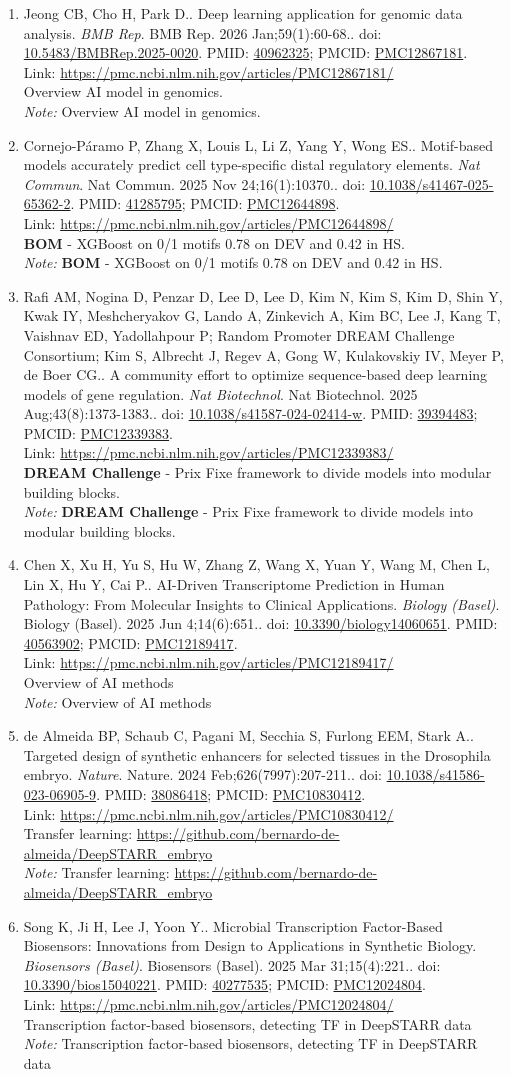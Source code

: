 \documentclass[12pt]{article}
\newcommand{\Pub}[9]{%
  \item #1. #2. \textit{#3}. #4. doi: \href{https://doi.org/#5}{#5}. PMID: \href{https://pubmed.ncbi.nlm.nih.gov/#6/}{#6}; PMCID: \href{https://www.ncbi.nlm.nih.gov/pmc/articles/#7/}{#7}. \\
  \noindent Link: \url{#8}\\
  \ifx#9\relax\else\\\textit{Note:} #9\fi
}
\begin{document}
\begin{enumerate}[leftmargin=*,label=\textbf{\arabic*.}]
\Pub{Jeong CB, Cho H, Park D.}{Deep learning application for genomic data analysis}{BMB Rep}{BMB Rep. 2026 Jan;59(1):60-68.}{10.5483/BMBRep.2025-0020}{40962325}{PMC12867181}{https://pmc.ncbi.nlm.nih.gov/articles/PMC12867181/}{Overview AI model in genomics.}

\Pub{Cornejo-Páramo P, Zhang X, Louis L, Li Z, Yang Y, Wong ES.}{Motif-based models accurately predict cell type-specific distal regulatory elements}{Nat Commun}{Nat Commun. 2025 Nov 24;16(1):10370.}{10.1038/s41467-025-65362-2}{41285795}{PMC12644898}{https://pmc.ncbi.nlm.nih.gov/articles/PMC12644898/}{\textbf{BOM} - XGBoost on 0/1 motifs 0.78 on DEV and 0.42 in HS.}

\newpage

\Pub{Rafi AM, Nogina D, Penzar D, Lee D, Lee D, Kim N, Kim S, Kim D, Shin Y, Kwak IY, Meshcheryakov G, Lando A, Zinkevich A, Kim BC, Lee J, Kang T, Vaishnav ED, Yadollahpour P; Random Promoter DREAM Challenge Consortium; Kim S, Albrecht J, Regev A, Gong W, Kulakovskiy IV, Meyer P, de Boer CG.}{A community effort to optimize sequence-based deep learning models of gene regulation}{Nat Biotechnol}{Nat Biotechnol. 2025 Aug;43(8):1373-1383.}{10.1038/s41587-024-02414-w}{39394483}{PMC12339383}{https://pmc.ncbi.nlm.nih.gov/articles/PMC12339383/}{\textbf{DREAM Challenge} - Prix Fixe framework to divide models into modular building blocks.}

\Pub{Chen X, Xu H, Yu S, Hu W, Zhang Z, Wang X, Yuan Y, Wang M, Chen L, Lin X, Hu Y, Cai P.}{AI-Driven Transcriptome Prediction in Human Pathology: From Molecular Insights to Clinical Applications}{Biology (Basel)}{Biology (Basel). 2025 Jun 4;14(6):651.}{10.3390/biology14060651}{40563902}{PMC12189417}{https://pmc.ncbi.nlm.nih.gov/articles/PMC12189417/}{Overview of AI methods}

\Pub{de Almeida BP, Schaub C, Pagani M, Secchia S, Furlong EEM, Stark A.}{Targeted design of synthetic enhancers for selected tissues in the Drosophila embryo}{Nature}{Nature. 2024 Feb;626(7997):207-211.}{10.1038/s41586-023-06905-9}{38086418}{PMC10830412}{https://pmc.ncbi.nlm.nih.gov/articles/PMC10830412/}{Transfer learning: \url{https://github.com/bernardo-de-almeida/DeepSTARR_embryo}}

\Pub{Song K, Ji H, Lee J, Yoon Y.}{Microbial Transcription Factor-Based Biosensors: Innovations from Design to Applications in Synthetic Biology}{Biosensors (Basel)}{Biosensors (Basel). 2025 Mar 31;15(4):221.}{10.3390/bios15040221}{40277535}{PMC12024804}{https://pmc.ncbi.nlm.nih.gov/articles/PMC12024804/}{Transcription factor-based biosensors, detecting TF in DeepSTARR data}


\end{enumerate}
\end{document}
